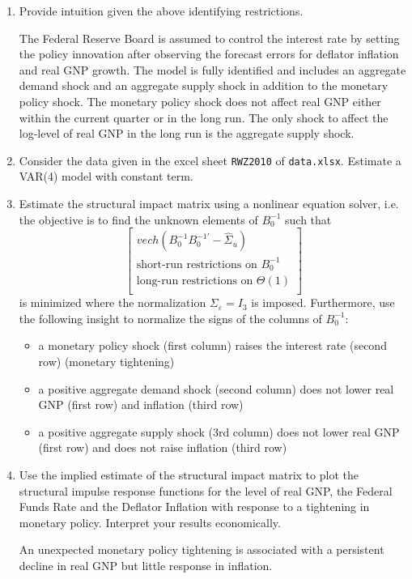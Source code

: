 \begin{enumerate}
    \item Provide intuition given the above identifying restrictions.
          \begin{solution}
              The Federal Reserve Board is assumed to control the interest rate by setting the policy innovation after observing the forecast errors for deflator inflation and real GNP growth. The model is fully identified and includes an aggregate demand shock and an aggregate supply shock in addition to the monetary policy shock. The monetary policy shock does not affect real GNP either within the current quarter or in the long run. The only shock to affect the log-level of real GNP in the long run is the aggregate supply shock.
          \end{solution}
    \item Consider the data given in the excel sheet \texttt{RWZ2010} of \texttt{data.xlsx}. Estimate a VAR(4) model with constant term.
    \item Estimate the structural impact matrix using a nonlinear equation solver, i.e. the objective is to find the unknown elements of $B_0^{-1}$ such that
          $$\begin{bmatrix}
                  vech(B_0^{-1}B_0^{-1'}-\hat{\Sigma}_u)    \\
                  \text{short-run restrictions on }B_0^{-1} \\
                  \text{long-run restrictions on }\Theta(1) \\
              \end{bmatrix}$$
          is minimized where the normalization $\Sigma_\varepsilon=I_3$ is imposed. Furthermore, use the following insight to normalize the signs of the columns of $B_0^{-1}$:
          \begin{itemize}
              \item a monetary policy shock (first column) raises the interest rate (second row) (monetary tightening)
              \item a positive aggregate demand shock (second column) does not lower real GNP (first row) and inflation (third row)
              \item a positive aggregate supply shock (3rd column) does not lower real GNP (first row) and does not raise inflation (third row)
          \end{itemize}
    \item Use the implied estimate of the structural impact matrix to plot the structural impulse response functions for the level of real GNP, the Federal Funds Rate and the Deflator Inflation with response to a tightening in monetary policy. Interpret your results economically.
          \begin{solution}
              An unexpected monetary policy tightening is associated with a persistent decline in real GNP but little response in inflation.
          \end{solution}
\end{enumerate}
\newpage

